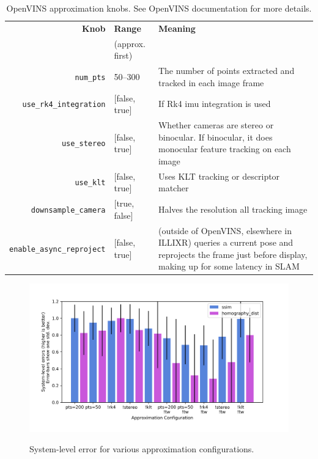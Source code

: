 \begin{table}
  \centering
  {
    \caption{OpenVINS approximation knobs. See OpenVINS documentation for more details\cite{Geneva2020ICRA}.}
    \begin{tabularx}{\linewidth}{r||l|X}
      \textbf{Knob} & \textbf{Range} & \textbf{Meaning} \\
      & {(approx. first)} & \\
      \hline\hline
      \verb+num_pts+ & 50--300 & The number of points extracted and tracked in each image frame \\
      \verb+use_rk4_integration+ & [false, true] & If Rk4 imu integration is used\\
      \verb+use_stereo+ & [false, true] & Whether cameras are stereo or binocular. If binocular, it does monocular feature tracking on each image \\
      \verb+use_klt+ & [false, true] & Uses KLT tracking or descriptor matcher \\
      \verb+downsample_camera+ & [true, false] & Halves the resolution all tracking image \\
      \verb+enable_async_reproject+ & [false, true] & (outside of OpenVINS, elsewhere in ILLIXR) queries a current pose and reprojects the frame just before display, making up for some latency in SLAM \\
    \end{tabularx}
  }
\end{table}

\begin{figure}[H]
  \caption{System-level error for various approximation configurations.}
  \includegraphics[width=\columnwidth]{system_errors.png}
  \label{system-level-errors}
\end{figure}

